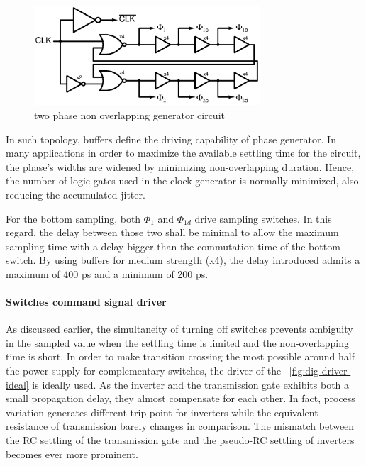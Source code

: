 \begin{figure}[htp]
	\centering
	\includegraphics[width=0.75\textwidth]{Chapter4/Figs/non-overlapp.ps}
	\caption{two phase non overlapping generator circuit}
	\label{fig:non-ov}
\end{figure}

In such topology, buffers define the driving capability of phase generator. In many applications in order to maximize the available settling time for the circuit, the phase's widths are widened by minimizing non-overlapping duration. Hence, the number of logic gates used in the clock generator is normally minimized, also reducing the accumulated jitter. 

For the bottom sampling, both \(\Phi_1\) and \(\Phi_{1d}\) drive sampling switches. In this regard, the delay between those two shall be minimal to allow the maximum sampling time with a delay bigger than the commutation time of the bottom switch. By using buffers for medium strength (x4), the delay introduced admits a maximum of 400 ps and a minimum of 200 ps.
\paragraph{Switches command signal driver}
\label{sec:dig-driver}

As discussed earlier, the simultaneity of turning off switches prevents ambiguity in the sampled value when the settling time is limited and the non-overlapping time is short. In order to make transition crossing the most possible around half the power supply for complementary switches, the driver of the \figurename~\ref{fig:dig-driver-ideal} is ideally used. As the inverter and the transmission gate exhibits both a small propagation delay, they almost compensate for each other. In fact, process variation generates different trip point for inverters while the equivalent resistance of transmission barely changes in comparison. The mismatch between the RC settling of the transmission gate and the pseudo-RC settling of inverters becomes ever more prominent. 

